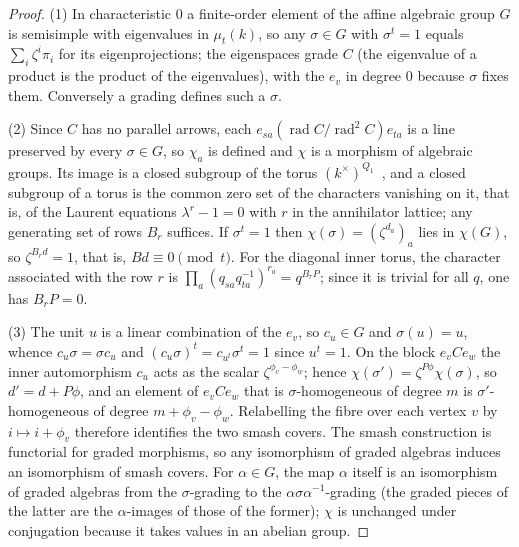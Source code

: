 \documentclass[11pt]{amsart}
\theoremstyle{plain}
\theoremstyle{definition}
\DeclareMathOperator{\rad}{rad}
\begin{document}
\begin{proof}
(1) In characteristic $0$ a finite-order element of the affine algebraic group $G$ is semisimple with
eigenvalues in $\mu_t(k)$, so any $\sigma\in G$ with $\sigma^t=1$ equals $\sum_i\zeta^i\pi_i$ for its
eigenprojections; the eigenspaces grade $C$ (the eigenvalue of a product is the product of the eigenvalues),
with the $e_v$ in degree $0$ because $\sigma$ fixes them. Conversely a grading defines such a $\sigma$.

(2) Since $C$ has no parallel arrows, each $e_{sa}(\rad C/\rad^2 C)e_{ta}$ is a line preserved by every
$\sigma\in G$, so $\chi_a$ is defined and $\chi$ is a morphism of algebraic groups. Its image is a closed
subgroup of the torus $(k^\times)^{Q_1}$~\cite[Proposition~2.2.5]{Springer}, and a closed subgroup of a torus
is the common zero set of the characters vanishing on it, that is, of the Laurent equations $\lambda^r-1=0$
with $r$ in the annihilator lattice; any generating set of rows $B_r$ suffices. If $\sigma^t=1$ then
$\chi(\sigma)=(\zeta^{d_a})_a$ lies in $\chi(G)$, so $\zeta^{B_r d}=1$, that is, $Bd\equiv0\pmod t$. For the
diagonal inner torus, the character associated with the row $r$ is
$\prod_a(q_{sa}q_{ta}^{-1})^{r_a}=q^{B_rP}$; since it is trivial for all $q$, one has $B_rP=0$.

(3) The unit $u$ is a linear combination of the $e_v$, so $c_u\in G$ and $\sigma(u)=u$, whence
$c_u\sigma=\sigma c_u$ and $(c_u\sigma)^t=c_{u^t}\sigma^t=1$ since $u^t=1$. On the block $e_vCe_w$ the inner
automorphism $c_u$ acts as the scalar $\zeta^{\phi_v-\phi_w}$; hence
$\chi(\sigma')=\zeta^{P\phi}\chi(\sigma)$, so $d'=d+P\phi$, and an element of $e_vCe_w$ that is
$\sigma$-homogeneous of degree $m$ is $\sigma'$-homogeneous of degree $m+\phi_v-\phi_w$. Relabelling the fibre
over each vertex $v$ by $i\mapsto i+\phi_v$ therefore identifies the two smash covers. The smash construction
is functorial for graded morphisms, so any isomorphism of graded algebras induces an isomorphism of smash
covers. For $\alpha\in G$, the map $\alpha$ itself is an isomorphism of graded algebras from the
$\sigma$-grading to the $\alpha\sigma\alpha^{-1}$-grading (the graded pieces of the latter are the
$\alpha$-images of those of the former); $\chi$ is unchanged under conjugation because it takes values in an
abelian group.


\end{proof}
\end{document}
